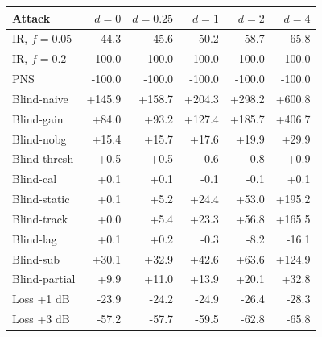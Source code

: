 \begin{tabular}{lrrrrr}
\hline
Attack & $d=0$ & $d=0.25$ & $d=1$ & $d=2$ & $d=4$\\
\hline
IR, $f=0.05$ & -44.3 & -45.6 & -50.2 & -58.7 & -65.8\\
IR, $f=0.2$ & -100.0 & -100.0 & -100.0 & -100.0 & -100.0\\
PNS & -100.0 & -100.0 & -100.0 & -100.0 & -100.0\\
Blind-naive & +145.9 & +158.7 & +204.3 & +298.2 & +600.8\\
Blind-gain & +84.0 & +93.2 & +127.4 & +185.7 & +406.7\\
Blind-nobg & +15.4 & +15.7 & +17.6 & +19.9 & +29.9\\
Blind-thresh & +0.5 & +0.5 & +0.6 & +0.8 & +0.9\\
Blind-cal & +0.1 & +0.1 & -0.1 & -0.1 & +0.1\\
Blind-static & +0.1 & +5.2 & +24.4 & +53.0 & +195.2\\
Blind-track & +0.0 & +5.4 & +23.3 & +56.8 & +165.5\\
Blind-lag & +0.1 & +0.2 & -0.3 & -8.2 & -16.1\\
Blind-sub & +30.1 & +32.9 & +42.6 & +63.6 & +124.9\\
Blind-partial & +9.9 & +11.0 & +13.9 & +20.1 & +32.8\\
Loss +1 dB & -23.9 & -24.2 & -24.9 & -26.4 & -28.3\\
Loss +3 dB & -57.2 & -57.7 & -59.5 & -62.8 & -65.8\\
\hline
\end{tabular}